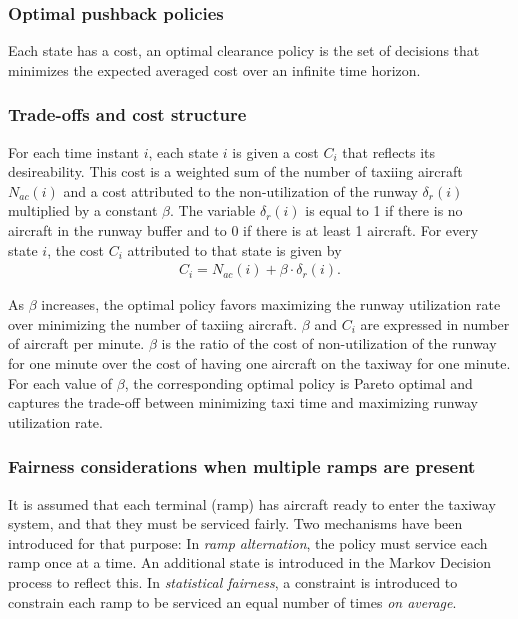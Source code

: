 \documentclass[letterpaper]{article}
\begin{document}
\subsubsection{Optimal pushback policies}
 Each state has a cost, an optimal clearance policy is the set of decisions that minimizes the expected averaged cost over an infinite time horizon.

\subsubsection{Trade-offs and cost structure}
For each time instant $i$, each state $i$ is given a cost $C_{i}$ that reflects its desireability. This cost is a weighted sum of the number of taxiing aircraft  $N_{ac}(i)$ and a cost attributed to the non-utilization of the runway $\delta_{r}(i)$ multiplied by a constant $\beta$. The variable $\delta_{r}(i)$ is equal to 1 if there is no aircraft in the runway buffer and to 0 if there is at least 1 aircraft.
 For every state $i$, the cost $C_{i}$ attributed to that state is given by
 \begin{eqnarray}
  \label{costi}
C_{i} = N_{ac}(i) + \beta \cdot \delta_{r}(i).
\end{eqnarray}

As $\beta$ increases, the optimal policy favors maximizing the runway utilization rate over minimizing the number of taxiing aircraft. $\beta$ and $C_{i}$ are expressed in number of aircraft per minute. $\beta$ is the ratio of the cost of non-utilization of the runway for one minute over the cost of having one aircraft on the taxiway for one minute.\\
For each value of $\beta$, the corresponding optimal policy is Pareto optimal and captures the trade-off between minimizing taxi time
 and maximizing runway utilization rate. 
 
\subsubsection{Fairness considerations when multiple ramps are present}
It is assumed that each terminal (ramp) has aircraft ready to enter the taxiway system, and that they must be serviced fairly. Two mechanisms have been introduced for that purpose: In {\em ramp alternation}, the policy must service each ramp once at a time. An additional state is introduced in the Markov Decision process to reflect this. In {\em statistical fairness}, a constraint is introduced to constrain each ramp to be serviced an equal number of times {\em on average}.
\end{document}

